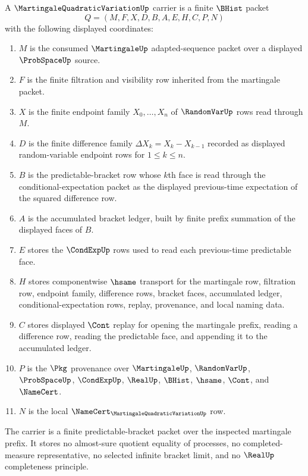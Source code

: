 \begin{definition}
\label{def:martingale-quadratic-variation-carrier}
A $\MartingaleQuadraticVariationUp$ carrier is a finite $\BHist$ packet
$$
Q=(M,F,X,D,B,A,E,H,C,P,N)
$$
with the following displayed coordinates:
\begin{enumerate}
\item $M$ is the consumed $\MartingaleUp$ adapted-sequence packet over a displayed $\ProbSpaceUp$ source.
\item $F$ is the finite filtration and visibility row inherited from the martingale packet.
\item $X$ is the finite endpoint family $X_0,\ldots,X_n$ of $\RandomVarUp$ rows read through $M$.
\item $D$ is the finite difference family $\Delta X_k=X_k-X_{k-1}$ recorded as displayed random-variable endpoint rows for $1\leq k\leq n$.
\item $B$ is the predictable-bracket row whose $k$th face is read through the conditional-expectation packet as the displayed previous-time expectation of the squared difference row.
\item $A$ is the accumulated bracket ledger, built by finite prefix summation of the displayed faces of $B$.
\item $E$ stores the $\CondExpUp$ rows used to read each previous-time predictable face.
\item $H$ stores componentwise $\hsame$ transport for the martingale row, filtration row, endpoint family, difference rows, bracket faces, accumulated ledger, conditional-expectation rows, replay, provenance, and local naming data.
\item $C$ stores displayed $\Cont$ replay for opening the martingale prefix, reading a difference row, reading the predictable face, and appending it to the accumulated ledger.
\item $P$ is the $\Pkg$ provenance over $\MartingaleUp$, $\RandomVarUp$, $\ProbSpaceUp$, $\CondExpUp$, $\RealUp$, $\BHist$, $\hsame$, $\Cont$, and $\NameCert$.
\item $N$ is the local $\NameCert_{\MartingaleQuadraticVariationUp}$ row.
\end{enumerate}
The carrier is a finite predictable-bracket packet over the inspected martingale prefix. It stores no almost-sure quotient equality of processes, no completed-measure representative, no selected infinite bracket limit, and no $\RealUp$ completeness principle.
\end{definition}

